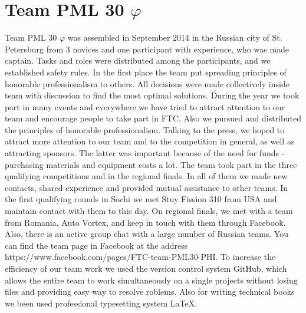 
\section{Team PML 30 ${\varphi}$} 
		Team PML 30 ${\varphi}$ was assembled in September 2014 in the Russian city of St. Petersburg from 3 novices and one participant with experience, who was made captain. Tasks and roles were distributed among the participants, and we established safety rules. In the first place the team put spreading principles of honorable professionalism to others. All decisions were made collectively inside team with discussion to find the most optimal solutions. 
		During the year we took part in many events and everywhere we have tried to attract attention to our team and encourage people to take part in FTC. Also we pursued and distributed the principles of honorable professionalism. Talking to the press, we hoped to attract more attention to our team and to the competition in general, as well as attracting sponsors. The latter was important because of the need for funds - purchasing materials and equipment costs a lot.
		The team took part in the three qualifying competitions and in the regional finals. In all of them we made new contacts, shared experience and provided mutual assistance to other teams. In the first qualifying rounds in Sochi we met Stuy Fission 310 from USA and maintain contact with them to this day. On regional finals, we met with a team from Romania, Auto Vortex, and keep in touch with them through Facebook. Also, there is an active group chat with a large number of Russian teams. You can find the team page in Facebook at the address https://www.facebook.com/pages/FTC-team-PML30-PHI.
	    To increase the efficiency of our team work we used the version control system GitHub, which allows the entire team to work simultaneously on a single projects without losing files and providing easy way to resolve roblems. Also for writing technical books we been used professional typesetting system LaTeX.
	    \\
